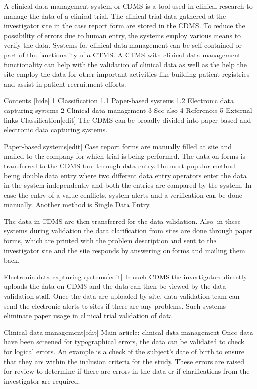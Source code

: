 A clinical data management system or CDMS is a tool used in clinical research to manage the data of a clinical trial. The clinical trial data gathered at the investigator site in the case report form are stored in the CDMS. To reduce the possibility of errors due to human entry, the systems employ various means to verify the data. Systems for clinical data management can be self-contained or part of the functionality of a CTMS. A CTMS with clinical data management functionality can help with the validation of clinical data as well as the help the site employ the data for other important activities like building patient registries and assist in patient recruitment efforts.

Contents  [hide] 
1	Classification
1.1	Paper-based systems
1.2	Electronic data capturing systems
2	Clinical data management
3	See also
4	References
5	External links
Classification[edit]
The CDMS can be broadly divided into paper-based and electronic data capturing systems.

Paper-based systems[edit]
Case report forms are manually filled at site and mailed to the company for which trial is being performed. The data on forms is transferred to the CDMS tool through data entry.The most popular method being double data entry where two different data entry operators enter the data in the system independently and both the entries are compared by the system. In case the entry of a value conflicts, system alerts and a verification can be done manually. Another method is Single Data Entry.

The data in CDMS are then transferred for the data validation. Also, in these systems during validation the data clarification from sites are done through paper forms, which are printed with the problem description and sent to the investigator site and the site responds by answering on forms and mailing them back.

Electronic data capturing systems[edit]
In such CDMS the investigators directly uploads the data on CDMS and the data can then be viewed by the data validation staff. Once the data are uploaded by site, data validation team can send the electronic alerts to sites if there are any problems. Such systems eliminate paper usage in clinical trial validation of data.

Clinical data management[edit]
Main article: clinical data management
Once data have been screened for typographical errors, the data can be validated to check for logical errors. An example is a check of the subject's date of birth to ensure that they are within the inclusion criteria for the study. These errors are raised for review to determine if there are errors in the data or if clarifications from the investigator are required.

